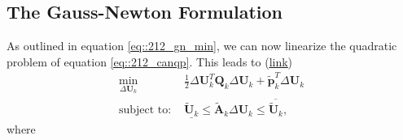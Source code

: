 \subsection{The Gauss-Newton Formulation}
\label{sec::212_gn}
As outlined in equation \ref{eq::212_gn_min}, we can now linearize the quadratic problem of equation \ref{eq::212_canqp}. This leads to (\href{https://github.com/mhubii/nmpc_pattern_generator/blob/dc1f5a9366cbbbf76f1b02cada642f6ac9a04c89/libs/pattern_generator/src/nmpc_generator.cpp#L377}{\underline{link}})
\begin{align}
	\min_{\Delta\bm{U}_k}&\frac{1}{2}\Delta\bm{U}_k^T\bm{Q}_k\Delta\bm{U}_k + \tilde{\bm{p}}_k^T\Delta\bm{U}_k 
	\label{eq::212_ocp}\\
	\text{subject to: }&\underline{\tilde{\bm{U}}_k} \leq \tilde{\bm{A}}_k\Delta\bm{U}_k\leq\overline{\tilde{\bm{U}}_k},
\end{align}
where
